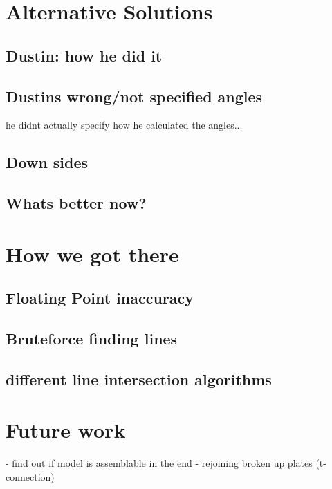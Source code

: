 \documentclass[../ClassicThesis.tex]{subfiles}
\begin{document}
\section{Alternative Solutions}
\subsection{Dustin: how he did it}
\subsection{Dustins wrong/not specified angles}
he didnt actually specify how he calculated the angles...
\subsection{Down sides}
\subsection{Whats better now?}

\section{How we got there}
\subsection{Floating Point inaccuracy}
\subsection{Bruteforce finding lines}
\subsection{different line intersection algorithms}

\section{Future work}
- find out if model is assemblable in the end
- rejoining broken up plates (t-connection)





\end{document}
